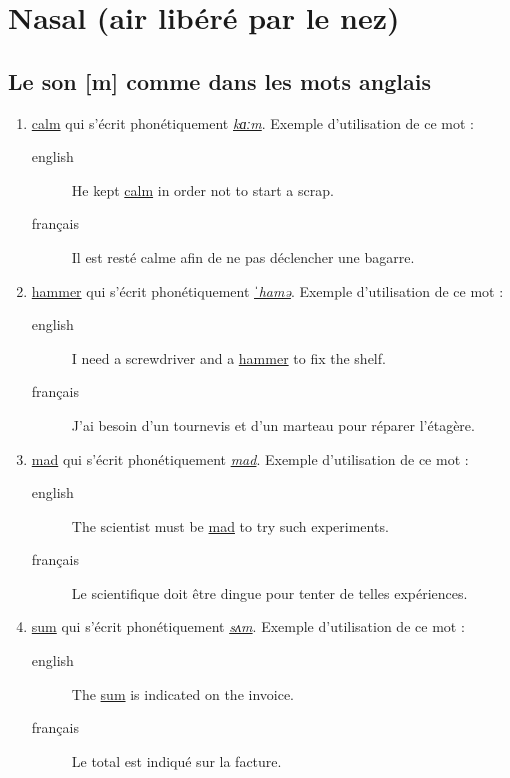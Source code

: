 \documentclass[12pt,a4paper]{book}
\begin{document}
\section{Nasal (air libéré par le nez)}
\label{sec:org63d4d3c}
\subsection{Le son [m] comme dans les mots anglais}
\label{sec:org6dbd0b1}
\begin{enumerate}
\item \href{http://www.wordreference.com/enfr/calm}{calm} qui s'écrit phonétiquement \href{https://en.oxforddictionaries.com/definition/calm}{\emph{kɑːm}}. Exemple d'utilisation de ce
mot :
\begin{description}
\item[{english}] \textenglish{He kept \href{https://youtu.be/1tXBl3Q5Ibc}{calm} in order not to start a scrap.}
\item[{français}] Il est resté calme afin de ne pas déclencher une
bagarre.
\end{description}
\item \href{http://www.wordreference.com/enfr/hammer}{hammer} qui s'écrit phonétiquement \href{https://en.oxforddictionaries.com/definition/hammer}{\emph{ˈhamə}}. Exemple d'utilisation de
ce mot :
\begin{description}
\item[{english}] \textenglish{I need a screwdriver and a \href{https://youtu.be/t5l2AUlD8Sk}{hammer} to fix the shelf.}
\item[{français}] J'ai besoin d'un tournevis et d'un marteau pour
réparer l'étagère.
\end{description}
\item \href{http://www.wordreference.com/enfr/mad}{mad} qui s'écrit phonétiquement \href{https://en.oxforddictionaries.com/definition/mad}{\emph{mad}}. Exemple d'utilisation de ce
mot :
\begin{description}
\item[{english}] \textenglish{The scientist must be \href{https://youtu.be/Oa-ae6\_okmg}{mad} to try such experiments.}
\item[{français}] Le scientifique doit être dingue pour tenter de telles expériences.
\end{description}
\item \href{http://www.wordreference.com/enfr/sum}{sum} qui s'écrit phonétiquement \href{https://en.oxforddictionaries.com/definition/sum}{\emph{sʌm}}. Exemple d'utilisation de ce
mot : 
\begin{description}
\item[{english}] \textenglish{The \href{https://youtu.be/ymUTWzsoiIg}{sum} is indicated on the invoice.}
\item[{français}] Le total est indiqué sur la facture.
\end{description}
\end{enumerate}
\end{document}
